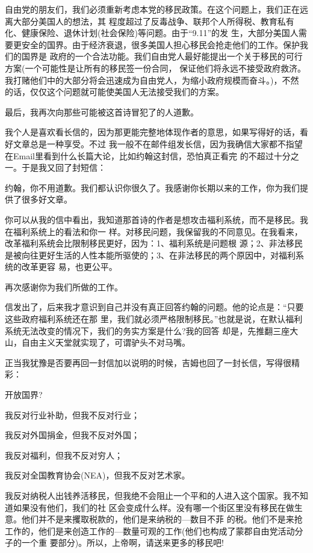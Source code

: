 ﻿\documentclass[11pt]{article}
\begin{document}
自由党的朋友们，我们必须重新考虑本党的移民政策。在这个问题上，我们正在远离大部分美国人的想法，其
程度超过了反毒战争、联邦个人所得税、教育私有化、健康保险、退休计划(社会保险)等问题。由于``9.11''的发
生，大部分美国人需要更安全的国界。由于经济衰退，很多美国人担心移民会抢走他们的工作。保护我们的国界是
政府的一个合法功能。我们自由党人最好能提出一个关于移民的可行方案(一个可能性是让所有的移民签一份合同，
保证他们将永远不接受政府救济。我打赌他们中的大部分将会迅速成为自由党人，为缩小政府规模而奋斗。)，不然
的话，仅仅这个问题就可能使美国人无法接受我们的方案。


最后，我再次向那些可能被这首诗冒犯了的人道歉。

我个人是喜欢看长信的，因为那更能完整地体现作者的意思，如果写得好的话，看好文章总是一种享受。不过
我一般不在邮件组发长信，因为我确信大家都不指望在Email里看到什么长篇大论，比如约翰这封信，恐怕真正看完
的不超过十分之一。于是我又回了封短信：

约翰，你不用道歉。我们都认识你很久了。我感谢你长期以来的工作，你为我们提供了很多好文章。

你可以从我的信中看出，我知道那首诗的作者是想攻击福利系统，而不是移民。我在福利系统上的看法和你一
样。对移民问题，我保留我的不同意见。在我看来，改革福利系统会比限制移民更好，因为：1、福利系统是问题根
源；2、非法移民是被向往更好生活的人性本能所驱使的；3、在非法移民的两个原因中，对福利系统的改革更容
易，也更公平。

再次感谢你为我们所做的工作。

信发出了，后来我才意识到自己并没有真正回答约翰的问题。他的论点是：``只要这些政府福利系统还在那
里，我们就必须严格限制移民。''也就是说，在默认福利系统无法改变的情况下，我们的务实方案是什么?我的回答
却是，先推翻三座大山，自由主义天堂就实现了，可谓驴头不对马嘴。

正当我犹豫是否要再回一封信加以说明的时候，吉姆也回了一封长信，写得很精彩：

开放国界?

我反对行业补助，但我不反对行业；

我反对外国捐金，但我不反对外国；

我反对福利，但我不反对穷人；

我反对全国教育协会(NEA)，但我不反对艺术家。

我反对纳税人出钱养活移民，但我绝不会阻止一个平和的人进入这个国家。我不知道如果没有他们，我们的社
区会变成什么样。没有哪一个街区里没有移民在做生意。他们并不是来攫取税款的，他们是来纳税的---数目不菲
的税。他们不是来抢工作的，他们是来创造工作的---数量可观的工作(他们也构成了蒙郡自由党活动分子的一个重
要部分)。所以，上帝啊，请送来更多的移民吧!
\end{document}
